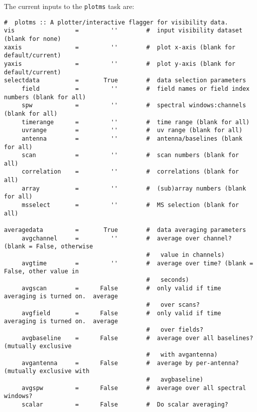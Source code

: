 The current inputs to the {\tt plotms} task are:
\small
\begin{verbatim}
#  plotms :: A plotter/interactive flagger for visibility data.
vis                 =         ''        #  input visibility dataset (blank for none)
xaxis               =         ''        #  plot x-axis (blank for default/current)
yaxis               =         ''        #  plot y-axis (blank for default/current)
selectdata          =       True        #  data selection parameters
     field          =         ''        #  field names or field index numbers (blank for all)
     spw            =         ''        #  spectral windows:channels (blank for all)
     timerange      =         ''        #  time range (blank for all)
     uvrange        =         ''        #  uv range (blank for all)
     antenna        =         ''        #  antenna/baselines (blank for all)
     scan           =         ''        #  scan numbers (blank for all)
     correlation    =         ''        #  correlations (blank for all)
     array          =         ''        #  (sub)array numbers (blank for all)
     msselect       =         ''        #  MS selection (blank for all)

averagedata         =       True        #  data averaging parameters
     avgchannel     =         ''        #  average over channel?  (blank = False, otherwise
                                        #   value in channels)
     avgtime        =         ''        #  average over time? (blank = False, other value in
                                        #   seconds)
     avgscan        =      False        #  only valid if time averaging is turned on.  average
                                        #   over scans?
     avgfield       =      False        #  only valid if time averaging is turned on.  average
                                        #   over fields?
     avgbaseline    =      False        #  average over all baselines?  (mutually exclusive
                                        #   with avgantenna)
     avgantenna     =      False        #  average by per-antenna?  (mutually exclusive with
                                        #   avgbaseline)
     avgspw         =      False        #  average over all spectral windows?
     scalar         =      False        #  Do scalar averaging?


\end{verbatim}
